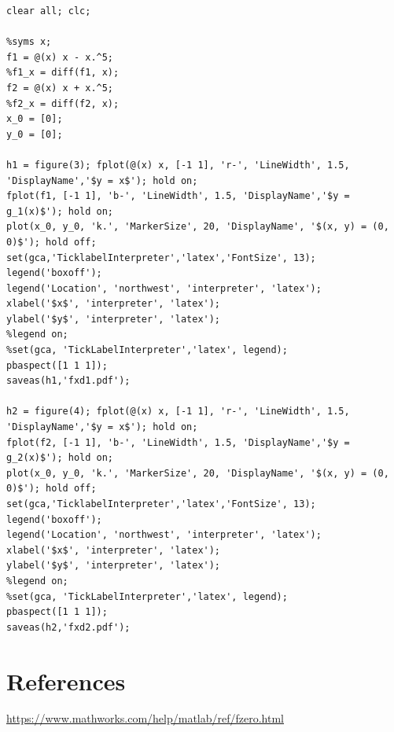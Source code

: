 \documentclass[11pt]{article} %
\begin{document}
\begin{lstlisting}[caption={Fixed point iteration examples (\textit{example.m}).}]
clear all; clc;

%syms x;
f1 = @(x) x - x.^5;
%f1_x = diff(f1, x);
f2 = @(x) x + x.^5;
%f2_x = diff(f2, x);
x_0 = [0];
y_0 = [0];

h1 = figure(3); fplot(@(x) x, [-1 1], 'r-', 'LineWidth', 1.5, 'DisplayName','$y = x$'); hold on; 
fplot(f1, [-1 1], 'b-', 'LineWidth', 1.5, 'DisplayName','$y = g_1(x)$'); hold on;
plot(x_0, y_0, 'k.', 'MarkerSize', 20, 'DisplayName', '$(x, y) = (0, 0)$'); hold off;
set(gca,'TicklabelInterpreter','latex','FontSize', 13);
legend('boxoff');
legend('Location', 'northwest', 'interpreter', 'latex');
xlabel('$x$', 'interpreter', 'latex');
ylabel('$y$', 'interpreter', 'latex');
%legend on;
%set(gca, 'TickLabelInterpreter','latex', legend);
pbaspect([1 1 1]);
saveas(h1,'fxd1.pdf');

h2 = figure(4); fplot(@(x) x, [-1 1], 'r-', 'LineWidth', 1.5, 'DisplayName','$y = x$'); hold on; 
fplot(f2, [-1 1], 'b-', 'LineWidth', 1.5, 'DisplayName','$y = g_2(x)$'); hold on;
plot(x_0, y_0, 'k.', 'MarkerSize', 20, 'DisplayName', '$(x, y) = (0, 0)$'); hold off;
set(gca,'TicklabelInterpreter','latex','FontSize', 13);
legend('boxoff');
legend('Location', 'northwest', 'interpreter', 'latex');
xlabel('$x$', 'interpreter', 'latex');
ylabel('$y$', 'interpreter', 'latex');
%legend on;
%set(gca, 'TickLabelInterpreter','latex', legend);
pbaspect([1 1 1]);
saveas(h2,'fxd2.pdf');
\end{lstlisting}

\newpage

\section*{\textbf{\huge{References}}}
\renewcommand\refname{}
\vspace{-1cm}
\begin{thebibliography}{}
\href{https://www.mathworks.com/help/matlab/ref/fzero.html}{https://www.mathworks.com/help/matlab/ref/fzero.html}
\end{thebibliography}
\fi
\end{document}
